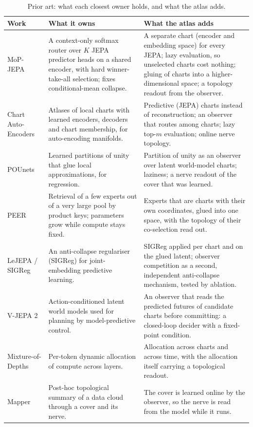 \begin{table}[t]
\centering
\small
\caption{Prior art: what each closest owner holds, and what the atlas adds.}
\label{tab:prior}
\begin{tabular}{@{}p{2.7cm}p{6.1cm}p{6.5cm}@{}}
\toprule
Work & What it owns & What the atlas adds \\
\midrule
MoP-JEPA~\cite{mopjepa} & A context-only softmax router over $K$ JEPA predictor heads on a shared encoder, with hard winner-take-all selection; fixes conditional-mean collapse. & A separate chart (encoder and embedding space) for every JEPA; lazy evaluation, so unselected charts cost nothing; gluing of charts into a higher-dimensional space; a topology readout from the observer. \\
Chart Auto-Encoders~\cite{schonsheck2019chartae} & Atlases of local charts with learned encoders, decoders and chart membership, for auto-encoding manifolds. & Predictive (JEPA) charts instead of reconstruction; an observer that routes among charts; lazy top-$m$ evaluation; online nerve topology. \\
POUnets~\cite{pounets} & Learned partitions of unity that glue local approximations, for regression. & Partition of unity as an observer over latent world-model charts; laziness; a nerve readout of the cover that was learned. \\
PEER~\cite{peer} & Retrieval of a few experts out of a very large pool by product keys; parameters grow while compute stays fixed. & Experts that are charts with their own coordinates, glued into one space, with the topology of their co-selection read out. \\
LeJEPA / SIGReg~\cite{lejepa} & An anti-collapse regulariser (SIGReg) for joint-embedding predictive learning. & SIGReg applied per chart and on the glued latent; observer competition as a second, independent anti-collapse mechanism, tested by ablation. \\
V-JEPA 2~\cite{vjepa2} & Action-conditioned latent world models used for planning by model-predictive control. & An observer that reads the predicted futures of candidate charts before committing: a closed-loop decider with a fixed-point condition. \\
Mixture-of-Depths~\cite{raposo2024mod} & Per-token dynamic allocation of compute across layers. & Allocation across charts and across time, with the allocation itself carrying a topological readout. \\
Mapper~\cite{singh2007mapper} & Post-hoc topological summary of a data cloud through a cover and its nerve. & The cover is learned online by the observer, so the nerve is read from the model while it runs. \\
\bottomrule
\end{tabular}
\end{table}
